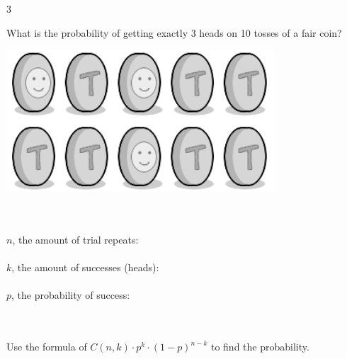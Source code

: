 \documentclass[a4paper,12pt]{book}
\newcounter{question}
\begin{document}
        \newpage
        \begin{question}{\thequestion}{3}

            What is the probability of getting exactly 3 heads
            on 10 tosses of a fair coin?

            \begin{center}
                \includegraphics[width=10cm]{images/6-3-coins.png}
            \end{center}

            ~\\~\\ \tab
            $n$, the amount of trial repeats: 
            ~\\~\\ \tab
            $k$, the amount of successes (heads): 
            ~\\~\\ \tab
            $p$, the probability of success: 

            ~\\~\\
            Use the formula of $ C(n, k) \cdot p^{k} \cdot (1 - p)^{n-k} $
            to find the probability.

        \end{question}
\end{document}
